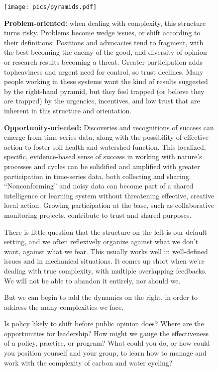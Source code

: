 \documentclass[11pt,letterpaper,twoside,onecolumn]{memoir}
\begin{document}
\begin{figure}
\begin{framed}
\texttt{[image: pics/pyramids.pdf]}
\small
\begin{minipage}{0.48\textwidth}
\textbf{Problem-oriented:} when dealing with complexity, this structure turns risky. Problems become wedge issues, or shift according to their definitions. Positions and advocacies tend to fragment, with the best becoming the enemy of the good, and diversity of opinion or research results becoming a threat. Greater participation adds topheaviness and urgent need for control, so trust declines. Many people working in these systems want the kind of results suggested by the right-hand pyramid, but they feel trapped (or believe they are trapped) by the urgencies, incentives, and low trust that are inherent in this structure and orientation.
\end{minipage}
\hfill
\begin{minipage}{0.48\textwidth}
\textbf{Opportunity-oriented:} Discoveries and recognitions of success can emerge from time-series data, along with the possibility of effective action to foster soil health and watershed function. This localized, specific, evidence-based sense of success in working with nature's processes and cycles can be solidified and amplified with greater participation in time-series data, both collecting and sharing. ``Nonconforming'' and noisy data can become part of a shared intelligence or learning system without threatening effective, creative local action. Growing participation at the base, such as collaborative monitoring projects, contribute to trust and shared purposes.
\end{minipage}
\vspace{1em}

There is little question that the structure on the left is our default setting, and we often reflexively organize against what we don't want, against what we fear. This usually works well in well-defined issues and in mechanical situations. It comes up short when we're dealing with true complexity, with multiple overlapping feedbacks. We will not be able to abandon it entirely, nor should we.

But we can begin to add the dynamics on the right, in order to address the many complexities we face.

Is policy likely to shift before public opinion does? Where are the opportunities for leadership? How might we gauge the effectiveness of a policy, practice, or program? What could you do, or how could you position yourself and your group, to learn how to manage and work with the complexity of carbon and water cycling?


\end{framed}
\end{figure}
\normalsize
\end{document}
